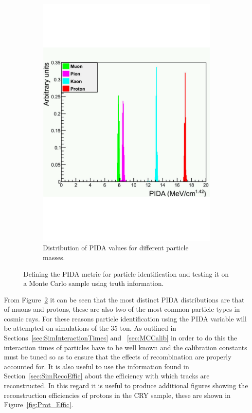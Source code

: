 \begin{figure}[h!]
\begin{subfigure}{0.45\textwidth}
    \includegraphics[width=\textwidth]{TruthPIDA}
    \caption{Distribution of PIDA values for different particle masses.}
    \label{fig:PIDA_MC}
  \end{subfigure}
  \caption[Defining the PIDA metric for particle identification.]
          {Defining the PIDA metric for particle identification and testing it on a Monte Carlo sample using truth information.}
          \label{fig:PIDAPlots}
\end{figure}

From Figure~\ref{fig:PIDAPlots} it can be seen that the most distinct PIDA distributions are that of muons and protons, these are also two of the most common particle types in cosmic rays. For these reasons particle identification using the PIDA variable will be attempted on simulations of the 35 ton. As outlined in Sections~\ref{sec:SimInteractionTimes} and ~\ref{sec:MCCalib} in order to do this the interaction times of particles have to be well known and the calibration constants must be tuned so as to ensure that the effects of recombination are properly accounted for. It is also useful to use the information found in Section~\ref{sec:SimRecoEffic} about the efficiency with which tracks are reconstructed. In this regard it is useful to produce additional figures showing the reconstruction efficiencies of protons in the CRY sample, these are shown in Figure~\ref{fig:Prot_Effic}.\\


